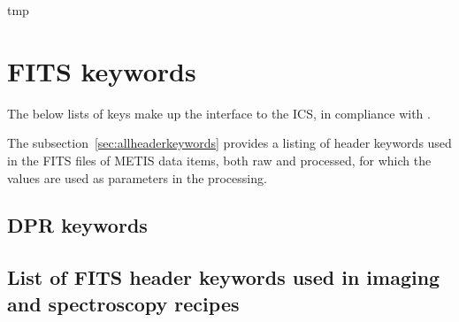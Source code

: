 tmp%
\section{FITS keywords}
\label{app:fits_keywords}

The below lists of keys make up the interface to the \ac{ICS}, in compliance with .



The subsection~\ref{sec:allheaderkeywords} provides a listing of header keywords used in the FITS files of METIS data items, both raw and processed, for which the values are used as parameters in the processing.
\subsection{DPR keywords}\label{sec:dprkeywords}

%

\subsection{List of FITS header keywords used in imaging and spectroscopy recipes}
\label{sec:essentialimagingheaders}


